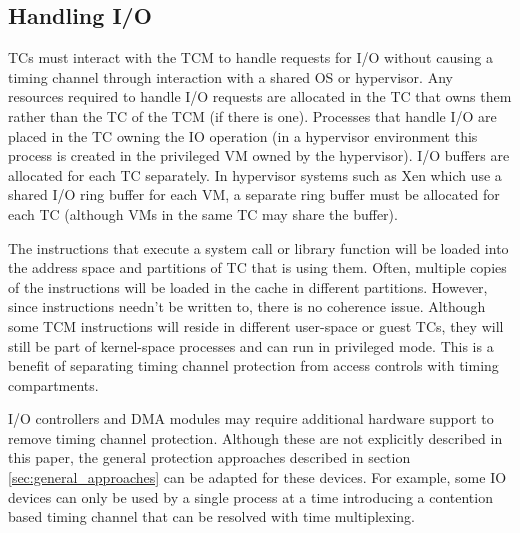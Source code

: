 \subsection{Handling I/O}
TCs must interact with the TCM to handle requests for I/O without causing a 
timing channel through interaction with a shared OS or hypervisor.
Any resources required to handle I/O requests are allocated in the TC that owns 
them rather than the TC of the TCM (if there is one).
Processes that handle I/O are placed in the TC owning the IO 
operation (in a hypervisor environment this process is created in the 
privileged VM owned by the hypervisor).
I/O buffers are allocated for each TC separately. In hypervisor systems such as
Xen\cite{xen-sosp03} which use a shared I/O ring buffer for each VM, a separate
ring buffer must be allocated for each TC (although VMs in the same TC may share
the buffer). 

The instructions that execute a system call or library function will be loaded
into the address space and partitions of TC that is using them. Often, multiple
copies of the instructions will be loaded in the cache in different partitions.
However, since instructions needn't be written to, there is no coherence issue. 
Although some TCM instructions will reside in different user-space or guest 
TCs, they will still be part of kernel-space processes and can run in 
privileged mode. This is a benefit of separating timing channel protection 
from access controls with timing compartments.


I/O controllers and DMA modules may require additional hardware support to 
remove timing channel protection. Although these are not explicitly described 
in this paper, the general protection approaches described in section
\ref{sec:general_approaches} can be adapted for these devices. For example,
some IO devices can only be used by a single process at a time introducing a
contention based timing channel that can be resolved with time multiplexing.

